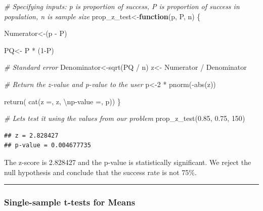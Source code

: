\documentclass[
]{book}
\newenvironment{Shaded}{\begin{snugshade}}{\end{snugshade}}
\newcommand{\CommentTok}[1]{\textcolor[rgb]{0.56,0.35,0.01}{\textit{#1}}}
\newcommand{\ControlFlowTok}[1]{\textcolor[rgb]{0.13,0.29,0.53}{\textbf{#1}}}
\newcommand{\DecValTok}[1]{\textcolor[rgb]{0.00,0.00,0.81}{#1}}
\newcommand{\FloatTok}[1]{\textcolor[rgb]{0.00,0.00,0.81}{#1}}
\newcommand{\FunctionTok}[1]{\textcolor[rgb]{0.00,0.00,0.00}{#1}}
\newcommand{\NormalTok}[1]{#1}
\newcommand{\OtherTok}[1]{\textcolor[rgb]{0.56,0.35,0.01}{#1}}
\newcommand{\SpecialCharTok}[1]{\textcolor[rgb]{0.00,0.00,0.00}{#1}}
\newcommand{\StringTok}[1]{\textcolor[rgb]{0.31,0.60,0.02}{#1}}
\begin{document}
\begin{Shaded}
\begin{Highlighting}[]
\CommentTok{\# Specifying inputs: p is proportion of success, P is proportion of success in population, n is sample size}
\NormalTok{prop\_z\_test}\OtherTok{\textless{}{-}}\ControlFlowTok{function}\NormalTok{(p, P, n) \{ }

\NormalTok{Numerator}\OtherTok{\textless{}{-}}\NormalTok{(p }\SpecialCharTok{{-}}\NormalTok{ P) }

\NormalTok{PQ}\OtherTok{\textless{}{-}}\NormalTok{ P }\SpecialCharTok{*}\NormalTok{ (}\DecValTok{1}\SpecialCharTok{{-}}\NormalTok{P) }

\CommentTok{\# Standard error}
\NormalTok{Denominator}\OtherTok{\textless{}{-}}\FunctionTok{sqrt}\NormalTok{(PQ }\SpecialCharTok{/}\NormalTok{ n) }
\NormalTok{z}\OtherTok{\textless{}{-}}\NormalTok{ Numerator }\SpecialCharTok{/}\NormalTok{ Denominator }

\CommentTok{\# Return the z{-}value and p{-}value to the user}
\NormalTok{p}\OtherTok{\textless{}{-}}\DecValTok{2} \SpecialCharTok{*} \FunctionTok{pnorm}\NormalTok{(}\SpecialCharTok{{-}}\FunctionTok{abs}\NormalTok{(z)) }

\FunctionTok{return}\NormalTok{( }\FunctionTok{cat}\NormalTok{(}\StringTok{\textquotesingle{}z =\textquotesingle{}}\NormalTok{, z, }
\StringTok{\textquotesingle{}}\SpecialCharTok{\textbackslash{}n}\StringTok{p{-}value =\textquotesingle{}}\NormalTok{, p)) }
\NormalTok{\} }

\CommentTok{\# Let\textquotesingle{}s test it using the values from our problem }
\FunctionTok{prop\_z\_test}\NormalTok{(}\FloatTok{0.85}\NormalTok{, }\FloatTok{0.75}\NormalTok{, }\DecValTok{150}\NormalTok{)}
\end{Highlighting}
\end{Shaded}

\begin{verbatim}
## z = 2.828427 
## p-value = 0.004677735
\end{verbatim}

The z-score is 2.828427 and the p-value is statistically significant. We reject the null hypothesis and conclude that the success rate is not 75\%.

\begin{center}\rule{0.5\linewidth}{0.5pt}\end{center}

\hypertarget{single-sample-t-tests-for-means}{%
\subsubsection{\texorpdfstring{\textbf{Single-sample t-tests for Means}}{Single-sample t-tests for Means}}\label{single-sample-t-tests-for-means}}
\end{document}
